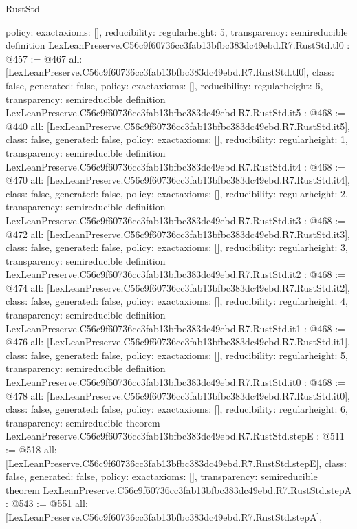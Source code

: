 \begin{lexlean}{RustStd}
\begin{coremodule}
{  policy: exact{axioms: []},
  reducibility: regular{height: 5},
  transparency: semireducible
}
definition LexLeanPreserve.C56c9f60736cc3fab13bfbc383dc49ebd.R7.RustStd.tl0 : @457 := @467 {
  all: [LexLeanPreserve.C56c9f60736cc3fab13bfbc383dc49ebd.R7.RustStd.tl0],
  class: false,
  generated: false,
  policy: exact{axioms: []},
  reducibility: regular{height: 6},
  transparency: semireducible
}
definition LexLeanPreserve.C56c9f60736cc3fab13bfbc383dc49ebd.R7.RustStd.it5 : @468 := @440 {
  all: [LexLeanPreserve.C56c9f60736cc3fab13bfbc383dc49ebd.R7.RustStd.it5],
  class: false,
  generated: false,
  policy: exact{axioms: []},
  reducibility: regular{height: 1},
  transparency: semireducible
}
definition LexLeanPreserve.C56c9f60736cc3fab13bfbc383dc49ebd.R7.RustStd.it4 : @468 := @470 {
  all: [LexLeanPreserve.C56c9f60736cc3fab13bfbc383dc49ebd.R7.RustStd.it4],
  class: false,
  generated: false,
  policy: exact{axioms: []},
  reducibility: regular{height: 2},
  transparency: semireducible
}
definition LexLeanPreserve.C56c9f60736cc3fab13bfbc383dc49ebd.R7.RustStd.it3 : @468 := @472 {
  all: [LexLeanPreserve.C56c9f60736cc3fab13bfbc383dc49ebd.R7.RustStd.it3],
  class: false,
  generated: false,
  policy: exact{axioms: []},
  reducibility: regular{height: 3},
  transparency: semireducible
}
definition LexLeanPreserve.C56c9f60736cc3fab13bfbc383dc49ebd.R7.RustStd.it2 : @468 := @474 {
  all: [LexLeanPreserve.C56c9f60736cc3fab13bfbc383dc49ebd.R7.RustStd.it2],
  class: false,
  generated: false,
  policy: exact{axioms: []},
  reducibility: regular{height: 4},
  transparency: semireducible
}
definition LexLeanPreserve.C56c9f60736cc3fab13bfbc383dc49ebd.R7.RustStd.it1 : @468 := @476 {
  all: [LexLeanPreserve.C56c9f60736cc3fab13bfbc383dc49ebd.R7.RustStd.it1],
  class: false,
  generated: false,
  policy: exact{axioms: []},
  reducibility: regular{height: 5},
  transparency: semireducible
}
definition LexLeanPreserve.C56c9f60736cc3fab13bfbc383dc49ebd.R7.RustStd.it0 : @468 := @478 {
  all: [LexLeanPreserve.C56c9f60736cc3fab13bfbc383dc49ebd.R7.RustStd.it0],
  class: false,
  generated: false,
  policy: exact{axioms: []},
  reducibility: regular{height: 6},
  transparency: semireducible
}
theorem LexLeanPreserve.C56c9f60736cc3fab13bfbc383dc49ebd.R7.RustStd.stepE : @511 := @518 {
  all: [LexLeanPreserve.C56c9f60736cc3fab13bfbc383dc49ebd.R7.RustStd.stepE],
  class: false,
  generated: false,
  policy: exact{axioms: []},
  transparency: semireducible
}
theorem LexLeanPreserve.C56c9f60736cc3fab13bfbc383dc49ebd.R7.RustStd.stepA : @543 := @551 {
  all: [LexLeanPreserve.C56c9f60736cc3fab13bfbc383dc49ebd.R7.RustStd.stepA],
}
\end{coremodule}
\end{lexlean}
